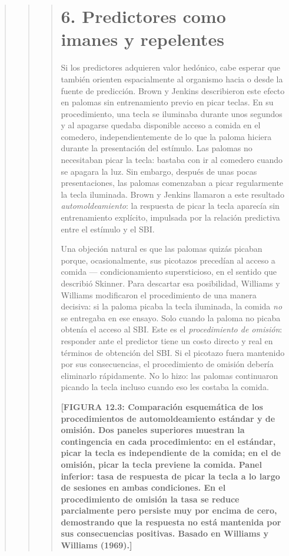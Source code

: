 \documentclass[
  letterpaper,
  DIV=11,
  numbers=noendperiod]{scrreprt}
\begin{document}
\begin{tcolorbox}[enhanced jigsaw, toprule=.15mm, arc=.35mm, colback=white, opacityback=0, colframe=quarto-callout-note-color-frame, breakable, rightrule=.15mm, left=2mm, leftrule=.75mm, bottomrule=.15mm]
\begin{quote}
\begin{quote}
\begin{quote}
\section{6. Predictores como imanes y
repelentes}\label{predictores-como-imanes-y-repelentes}

Si los predictores adquieren valor hedónico, cabe esperar que también
orienten espacialmente al organismo hacia o desde la fuente de
predicción. Brown y Jenkins describieron este efecto en palomas sin
entrenamiento previo en picar teclas. En su procedimiento, una tecla se
iluminaba durante unos segundos y al apagarse quedaba disponible acceso
a comida en el comedero, independientemente de lo que la paloma hiciera
durante la presentación del estímulo. Las palomas no necesitaban picar
la tecla: bastaba con ir al comedero cuando se apagara la luz. Sin
embargo, después de unas pocas presentaciones, las palomas comenzaban a
picar regularmente la tecla iluminada. Brown y Jenkins llamaron a este
resultado \emph{automoldeamiento}: la respuesta de picar la tecla
aparecía sin entrenamiento explícito, impulsada por la relación
predictiva entre el estímulo y el SBI.

Una objeción natural es que las palomas quizás picaban porque,
ocasionalmente, sus picotazos precedían al acceso a comida ---
condicionamiento supersticioso, en el sentido que describió Skinner.
Para descartar esa posibilidad, Williams y Williams modificaron el
procedimiento de una manera decisiva: si la paloma picaba la tecla
iluminada, la comida \emph{no} se entregaba en ese ensayo. Solo cuando
la paloma no picaba obtenía el acceso al SBI. Este es el
\emph{procedimiento de omisión}: responder ante el predictor tiene un
costo directo y real en términos de obtención del SBI. Si el picotazo
fuera mantenido por sus consecuencias, el procedimiento de omisión
debería eliminarlo rápidamente. No lo hizo: las palomas continuaron
picando la tecla incluso cuando eso les costaba la comida.

\textbf{{[}FIGURA 12.3: Comparación esquemática de los procedimientos de
automoldeamiento estándar y de omisión. Dos paneles superiores muestran
la contingencia en cada procedimiento: en el estándar, picar la tecla es
independiente de la comida; en el de omisión, picar la tecla previene la
comida. Panel inferior: tasa de respuesta de picar la tecla a lo largo
de sesiones en ambas condiciones. En el procedimiento de omisión la tasa
se reduce parcialmente pero persiste muy por encima de cero, demostrando
que la respuesta no está mantenida por sus consecuencias positivas.
Basado en Williams y Williams (1969).{]}}


\end{quote}
\end{quote}
\end{quote}
\end{tcolorbox}
\end{document}
